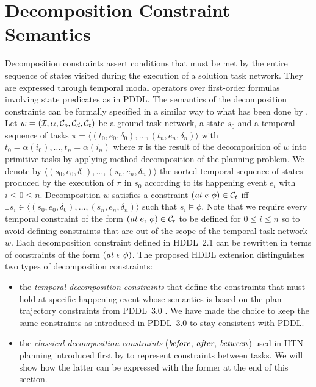 \documentclass[letterpaper]{article} %
\newcommand{\at}{\text{\it at}}
\newcommand{\before}{\text{\it before}}
\newcommand{\after}{\text{\it after}}
\renewcommand{\between}{\text{\it between}}
\begin{document}
\section{Decomposition Constraint Semantics}
\label{Sec:Decomposition-Constraints-Semantics}

Decomposition constraints assert conditions that must be met by the entire sequence of states visited during the execution of a solution task network. They are expressed through temporal modal operators over first-order formulas involving state predicates as in PDDL. The semantics of the decomposition constraints can be formally specified in a similar way to what has been done by \citep{gerevini05}. Let $w = ({\cal{I}}, \alpha, {\cal{C}}_o, {\cal{C}}_d, {\cal{C}}_t)$ be a ground task network, a state $s_0$ and a temporal sequence of tasks $\pi = \langle (t_0, e_0, \delta_0), \ldots, (t_n, e_n, \delta_n) \rangle $ with $t_0 = \alpha(i_0), \ldots, t_n = \alpha(i_n)$ where $\pi$ is the result of the decomposition of $w$ into primitive tasks by applying method decomposition of the planning problem. We denote by $\langle (s_0, e_0, \delta_0), \ldots, (s_n, e_n, \delta_n) \rangle$ the sorted temporal sequence of states produced by the execution of $\pi$ in $s_0$ according to its happening event $e_i$ with $i \leq 0 \leq n$. Decomposition $w$ satisfies a constraint $(\at \ e \ \phi) \in {\cal{C}}_t$ iff $\exists s_i \in \langle (s_0, e_0, \delta_0), \ldots, (s_n, e_n, \delta_n) \rangle$ such that $s_i \models \phi$. Note that we require every temporal constraint of the form $(\at \ e_i \ \phi) \in {\cal{C}}_t$ to be defined for $0 \leq i \leq n$ so to avoid defining constraints that are out of the scope of the temporal task network $w$. Each decomposition constraint defined in HDDL~2.1 can be rewritten in terms of constraints of the form $(\at \ e\ \phi)$. The proposed HDDL extension distinguishes two types of decomposition constraints:
\begin{itemize}
    \item the \emph{temporal decomposition constraints} that define the constraints that must hold at specific happening event whose semantics is based on the plan trajectory constraints from PDDL~3.0 \cite{gerevini05}. We have made the choice to keep the same constraints as introduced in PDDL~3.0 to stay consistent with PDDL.
    \item the \emph{classical decomposition constraints} ($\before$, $\after$, $\between$) used in HTN planning introduced first by \citep{erol94} to represent constraints between tasks. We will show how the latter can be expressed with the former at the end of this section.
\end{itemize}
\end{document}

